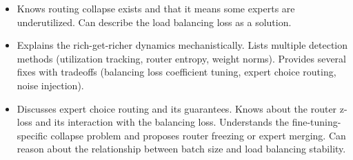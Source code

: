 \begin{interviewq}
\goodgreat
\begin{itemize}
    \item {} Knows routing collapse exists and that it means some experts are underutilized. Can describe the load balancing loss as a solution.
    \item {} Explains the rich-get-richer dynamics mechanistically. Lists multiple detection methods (utilization tracking, router entropy, weight norms). Provides several fixes with tradeoffs (balancing loss coefficient tuning, expert choice routing, noise injection).
    \item {} Discusses expert choice routing and its guarantees. Knows about the router z-loss and its interaction with the balancing loss. Understands the fine-tuning-specific collapse problem and proposes router freezing or expert merging. Can reason about the relationship between batch size and load balancing stability.
\end{itemize}

\end{interviewq}

